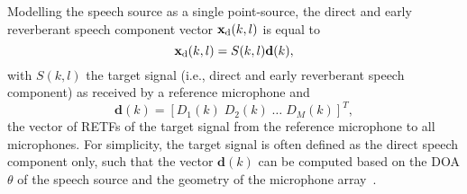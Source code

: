 \documentclass[10pt]{IEEEtran}
\begin{document}
Modelling the speech source as a single point-source, the direct and early reverberant speech component vector $\mathbf{x}_{\rm d}(k,l)$ is equal to
\begin{equation}
\label{eq: point_source}
\mathbf{x}_{\rm d}(k,l) = S(k,l)\mathbf{d}(k),
\end{equation}
with $S(k,l)$ the target signal (i.e., direct and early reverberant speech component) as received by a reference microphone and 
\begin{equation}
\mathbf{d}(k) = [D_1(k) \; D_2(k) \; \ldots \; D_M(k)]^T,
\end{equation}
the vector of RETFs of the target signal from the reference microphone to all microphones. 
For simplicity, the target signal is often defined as the direct speech component only, such that the vector $\mathbf{d}(k)$ can be computed based on the DOA $\theta$ of the speech source and the geometry of the microphone array~\cite{Braun_EUSIPCO_2013,Kuklasinski_EUSIPCO_2014g,Kuklasinksi_ICASSP_2015,Braun_EURASIP_2015,Schwartz_WASPAA_2015,Schwartz_ICASSP_2016,Kuklasinski_ITASLP_2016,kuklasinski_AES_2016}. 
\end{document}
